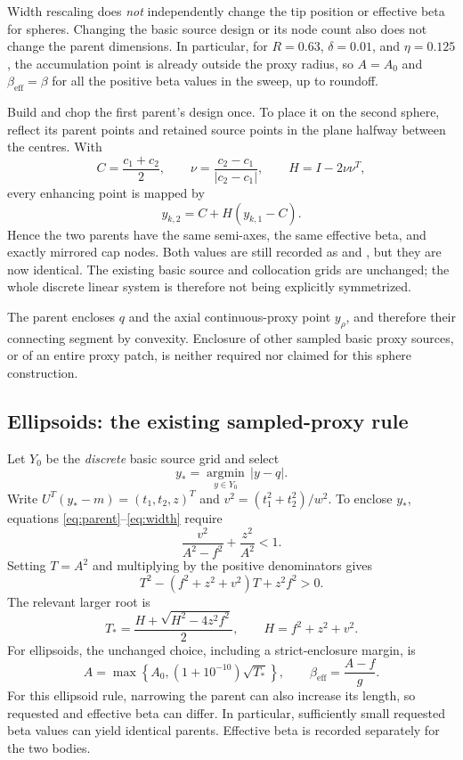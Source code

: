 \documentclass[11pt,a4paper]{article}
\newcommand{\code}[1]{\texttt{\detokenize{#1}}}
\begin{document}
Width rescaling does \emph{not} independently change the tip position or
effective beta for spheres.  Changing the basic source design or its node
count also does not change the parent dimensions.  In particular, for
$R=0.63$, $\delta=0.01$, and $\eta=0.125$, the accumulation point is already
outside the proxy radius, so $A=A_0$ and $\beta_{\mathrm{eff}}=\beta$ for all
the positive beta values in the sweep, up to roundoff.

Build and chop the first parent's design once.  To place it on the second
sphere, reflect its parent points and retained source points in the plane
halfway between the centres.  With
\[
 C=\frac{c_1+c_2}{2},\qquad
 \nu=\frac{c_2-c_1}{|c_2-c_1|},\qquad H=I-2\nu\nu^T,
\]
every enhancing point is mapped by
\begin{equation}
 y_{k,2}=C+H(y_{k,1}-C).
\end{equation}
Hence the two parents have the same semi-axes, the same effective beta, and
exactly mirrored cap nodes.  Both values are still recorded as
\code{effectiveBeta1} and \code{effectiveBeta2}, but they are now identical.
The existing basic source and collocation grids are unchanged; the whole
discrete linear system is therefore not being explicitly symmetrized.

The parent encloses $q$ and the axial continuous-proxy point $y_\rho$, and
therefore their connecting segment by convexity.  Enclosure of other sampled
basic proxy sources, or of an entire proxy patch, is neither required nor
claimed for this sphere construction.

\subsection{Ellipsoids: the existing sampled-proxy rule}

Let $Y_0$ be the \emph{discrete} basic source grid and select
\[
 y_* = \underset{y\in Y_0}{\operatorname{argmin}}\,|y-q|.
\]
Write $U^T(y_*-m)=(t_1,t_2,z)^T$ and
$v^2=(t_1^2+t_2^2)/w^2$.  To enclose $y_*$, equations
\eqref{eq:parent}--\eqref{eq:width} require
\[
 \frac{v^2}{A^2-f^2}+\frac{z^2}{A^2}<1.
\]
Setting $T=A^2$ and multiplying by the positive denominators gives
\[
 T^2-(f^2+z^2+v^2)T+z^2f^2>0.
\]
The relevant larger root is
\begin{equation}
 T_* = \frac{H+\sqrt{H^2-4z^2f^2}}{2},
 \qquad H=f^2+z^2+v^2.
\end{equation}
For ellipsoids, the unchanged choice, including a strict-enclosure margin, is
\begin{equation}
 A=\max\left\{A_0,(1+10^{-10})\sqrt{T_*}\right\},
 \qquad
 \beta_{\mathrm{eff}}=\frac{A-f}{g}.
\end{equation}
For this ellipsoid rule, narrowing the parent can also increase its length, so
requested and effective beta can differ.  In particular, sufficiently
small requested beta values can yield identical parents.  Effective beta is
recorded separately for the two bodies.
\end{document}
